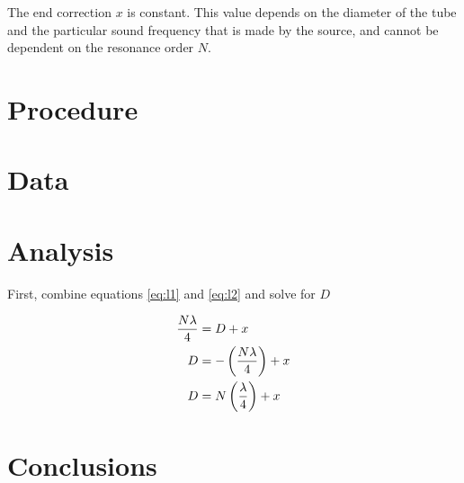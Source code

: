 \documentclass{article}
\numberwithin{equation}{section}
\begin{document}
The end correction \(x\) is constant. This value depends on the diameter of the tube and the particular sound frequency that is made by the source, and cannot be dependent on the resonance order \(N\).

\section{Procedure}

\section{Data}

\section{Analysis}
First, combine equations \eqref{eq:l1} and \eqref{eq:l2} and solve for \(D\)

\begin{align}
  \frac{N \lambda}{4} &= D + x \notag \\
  D &= - \left (\frac{N \lambda}{4} \right) + x \notag \\
  D &= N \left(\frac{\lambda}{4} \right) + x
\end{align}
\section{Conclusions}
\end{document}
